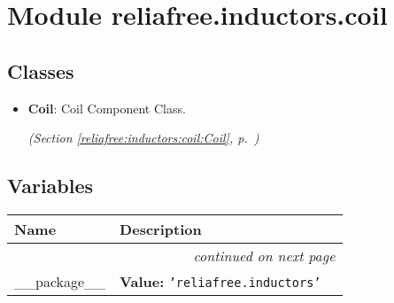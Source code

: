 %
%
%


\section{Module reliafree.inductors.coil}

    \label{reliafree:inductors:coil}


\subsection{Classes}

\begin{itemize}  \setlength{\parskip}{0ex}
  \item \textbf{Coil}: Coil Component Class.



  \textit{(Section \ref{reliafree:inductors:coil:Coil}, p.~\pageref{reliafree:inductors:coil:Coil})}

\end{itemize}


  \subsection{Variables}

    \vspace{-1cm}
\hspace{\varindent}\begin{longtable}{|p{\varnamewidth}|p{\vardescrwidth}|l}
\cline{1-2}
\cline{1-2} \centering \textbf{Name} & \centering \textbf{Description}& \\
\cline{1-2}
\endhead\cline{1-2}\multicolumn{3}{r}{\small\textit{continued on next page}}\\\endfoot\cline{1-2}
\endlastfoot\raggedright \_\-\_\-p\-a\-c\-k\-a\-g\-e\-\_\-\_\- & \raggedright \textbf{Value:} 
{\tt \texttt{'}\texttt{reliafree.inductors}\texttt{'}}&\\
\cline{1-2}
\end{longtable}

